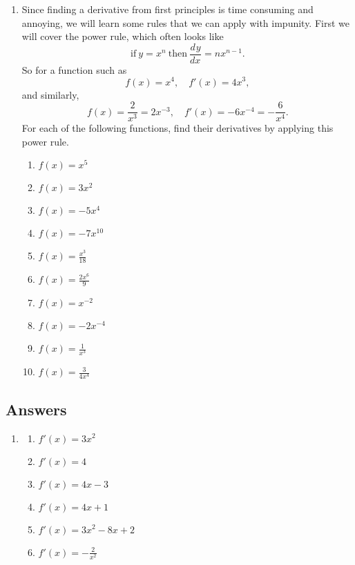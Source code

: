 \documentclass[a4paper,12pt]{article}
\newcommand{\deriv}[3][]{\frac{d^{#1}#2}{d#3^{#1}}}
\begin{document}
\begin{enumerate}
\item Since finding a derivative from first principles is time consuming and 
annoying, we will learn some rules that we can apply with impunity. First 
we will cover the power rule, which often looks like
$$\mathrm{if~} y = x^n \mathrm{~then~} \deriv{y}{x} = nx^{n - 1}.$$
So for a function such as 
$$f(x) = x^4,\quad f'(x) = 4x^3,$$
and similarly,
$$f(x) = \frac{2}{x^3} = 2x^{-3}, \quad f'(x) = -6x^{-4} = -\frac{6}{x^4}.$$
For each of the following functions, find their derivatives by applying 
this power rule.
    \begin{multicols}{2}
    \begin{enumerate}
    \item $f(x) = x^5$
    \item $f(x) = 3x^2$
    \item $f(x) = -5x^4$
    \item $f(x) = -7x^{10}$
    \item $f(x) = \frac{x^3}{18}$
    \item $f(x) = \frac{2x^6}{9}$
    \item $f(x) = x^{-2}$
    \item $f(x) = -2x^{-4}$
    \item $f(x) = \frac{1}{x^3}$
    \item $f(x) = \frac{3}{4x^4}$
    \end{enumerate}
    \end{multicols}

\end{enumerate}
\newpage
\subsection*{Answers}

\begin{enumerate}
\item
    \begin{multicols}{2}
    \begin{enumerate}
    \item $f'(x) = 3x^2$
    \item $f'(x) = 4$
    \item $f'(x) = 4x - 3$
    \item $f'(x) = 4x + 1$
    \item $f'(x) = 3x^2 - 8x + 2$
    \item $f'(x) = -\frac{2}{x^2}$
    \end{enumerate}
    \end{multicols}

\end{enumerate}
\end{document}
